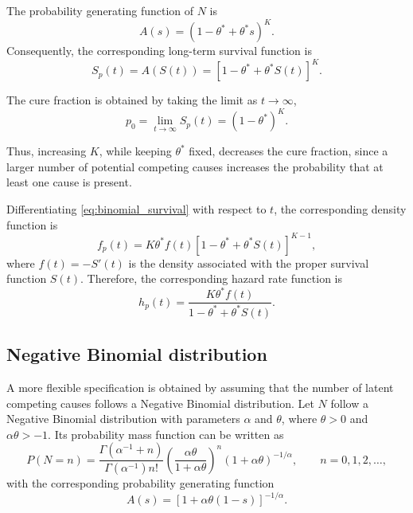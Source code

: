 The probability generating function of $N$ is
\begin{equation}
\label{eq:binomial_pgf}
A(s)
=
\left(1-\theta^*+\theta^*s\right)^K.
\end{equation}
Consequently, the corresponding long-term survival function is
\begin{equation}
\label{eq:binomial_survival}
S_p(t)
=
A\left(S(t)\right)
=
\left[1-\theta^*+\theta^*S(t)\right]^K.
\end{equation}

The cure fraction is obtained by taking the limit as $t\rightarrow\infty$,
\begin{equation}
\label{eq:binomial_cure_fraction}
p_0
=
\lim_{t\rightarrow\infty}S_p\left(t\right)
=
\left(1-\theta^*\right)^K.
\end{equation}

Thus, increasing $K$, while keeping $\theta^*$ fixed, decreases the cure fraction, since
a larger number of potential competing causes increases the probability that at least
one cause is present.

Differentiating \eqref{eq:binomial_survival} with respect to $t$, the corresponding
density function is
\begin{equation}
\label{eq:binomial_density}
f_p\left(t\right)
=
K\theta^*f\left(t\right)
\left[1-\theta^*+\theta^*S\left(t\right)\right]^{K-1},
\end{equation}
where $f\left(t\right)=-S'\left(t\right)$ is the density associated with the proper survival function $S(t)$.
Therefore, the corresponding hazard rate function is
\begin{equation}
\label{eq:binomial_hazard}
h_p\left(t\right)
=
\frac{K\theta^*f\left(t\right)}
{1-\theta^*+\theta^*S\left(t\right)}.
\end{equation}


\subsection{Negative Binomial distribution}

A more flexible specification is obtained by assuming that the number of latent competing
causes follows a Negative Binomial distribution. Let $N$ follow a Negative Binomial
distribution with parameters $\alpha$ and $\theta$, where $\theta>0$ and
$\alpha\theta>-1$. Its probability mass function can be written as
\begin{equation}
\label{eq:negative_binomial_pmf}
P\left(N=n\right)
=
\frac{\Gamma\left(\alpha^{-1}+n\right)}
{\Gamma\left(\alpha^{-1}\right)n!}
\left(\frac{\alpha\theta}{1+\alpha\theta}\right)^n
\left(1+\alpha\theta\right)^{-1/\alpha},
\qquad n=0,1,2,\ldots,
\end{equation}
with the corresponding probability generating function
\begin{equation}
\label{eq:negative_binomial_pgf}
A\left(s\right)
=
\left[1+\alpha\theta(1-s)\right]^{-1/\alpha}.
\end{equation}

